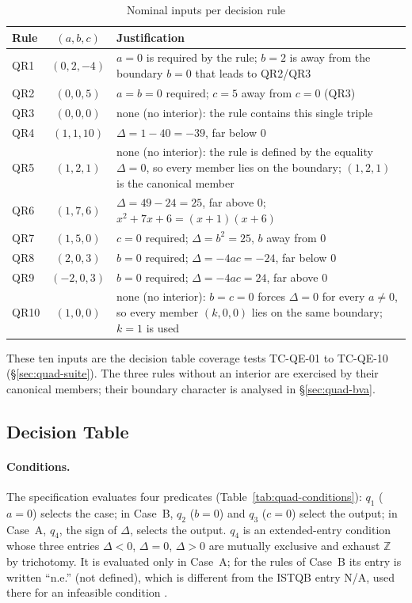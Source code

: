 \documentclass[11pt,a4paper]{article}
\begin{document}
\begin{table}[H]
\centering
\caption{Nominal inputs per decision rule}
\label{tab:quad-norms}
\small
\begin{tabularx}{\textwidth}{l c Y}
\toprule
Rule & \((a,b,c)\) & Justification \\
\midrule
QR1 & \((0,2,-4)\) & \(a=0\) is required by the rule; \(b=2\) is away from the boundary \(b=0\) that leads to QR2/QR3 \\
QR2 & \((0,0,5)\) & \(a=b=0\) required; \(c=5\) away from \(c=0\) (QR3) \\
QR3 & \((0,0,0)\) & none (no interior): the rule contains this single triple \\
QR4 & \((1,1,10)\) & \(\Delta=1-40=-39\), far below \(0\) \\
QR5 & \((1,2,1)\) & none (no interior): the rule is defined by the equality \(\Delta=0\), so every member lies on the boundary; \((1,2,1)\) is the canonical member \\
QR6 & \((1,7,6)\) & \(\Delta=49-24=25\), far above \(0\); \(x^2+7x+6=(x+1)(x+6)\) \\
QR7 & \((1,5,0)\) & \(c=0\) required; \(\Delta=b^2=25\), \(b\) away from \(0\) \\
QR8 & \((2,0,3)\) & \(b=0\) required; \(\Delta=-4ac=-24\), far below \(0\) \\
QR9 & \((-2,0,3)\) & \(b=0\) required; \(\Delta=-4ac=24\), far above \(0\) \\
QR10 & \((1,0,0)\) & none (no interior): \(b=c=0\) forces \(\Delta=0\) for every \(a\ne0\), so every member \((k,0,0)\) lies on the same boundary; \(k=1\) is used \\
\bottomrule
\end{tabularx}
\end{table}

These ten inputs are the decision table coverage tests TC-QE-01 to TC-QE-10
(\S\ref{sec:quad-suite}). The three rules without an interior are exercised by their
canonical members; their boundary character is analysed in
\S\ref{sec:quad-bva}.
\subsection{Decision Table}
\label{sec:quad-dt}

\paragraph{Conditions.} The specification evaluates four predicates
(Table~\ref{tab:quad-conditions}): \(q_1\) (\(a=0\)) selects the case; in
Case~B, \(q_2\) (\(b=0\)) and \(q_3\) (\(c=0\)) select the output; in
Case~A, \(q_4\), the sign of \(\Delta\), selects the output. \(q_4\) is an
extended-entry condition whose three entries \(\Delta<0\), \(\Delta=0\),
\(\Delta>0\) are mutually exclusive and exhaust \(\mathbb{Z}\) by
trichotomy. It is evaluated only in Case~A; for the rules of Case~B its entry
is written ``n.e.'' (not defined), which is different from the ISTQB entry
N/A, used there for an infeasible condition \cite[\S4.2.3]{istqb}.
\end{document}
